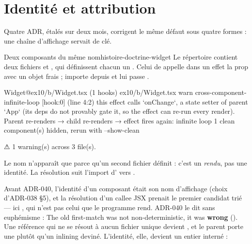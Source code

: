 \section{Identité et attribution}
\label{sec:histoire-doctrine-identite}

Quatre ADR, étalés sur deux mois, corrigent le même défaut sous quatre formes : une chaîne d'affichage servait de clé.

\begin{exemple}{Deux composants du même nom}{histoire-doctrine-widget}
Le répertoire  contient deux fichiers  et , qui définissent chacun un . Celui de  appelle dans un effet la prop  avec un objet frais ;  importe  depuis  et lui passe .
\begin{sortie}
  Widget@ex10/b/Widget.tsx  (1 hooks)  ex10/b/Widget.tsx
    warn   cross-component-infinite-loop  [hook:0]  (line 4:2)  this effect calls `onChange`, a state setter of parent `App` (its deps do not provably gate it, so the effect can re-run every render). Parent re-renders → child re-renders → effect fires again: infinite loop
   1 clean component(s) hidden, rerun with --show-clean

⚠  1 warning(s) across 3 file(s).
\end{sortie}
Le nom  n'apparaît que parce qu'un second fichier définit  : c'est un \emph{rendu}, pas une identité. La résolution suit l'import d' vers .
\end{exemple}

Avant ADR-040, l'identité d'un composant était son nom d'affichage (choix d'ADR-038 §5), et la résolution d'un callee JSX prenait le premier candidat trié --- ici , qui n'est pas celui que le programme rend. ADR-040 le dit sans euphémisme : \og The old first-match was not non-deterministic, it was \textbf{wrong}\fg{} (). Une référence qui ne se résout à aucun fichier unique devient , et le parent porte une \Info{}  plutôt qu'un inlining deviné. L'identité, elle, devient un entier interné :


